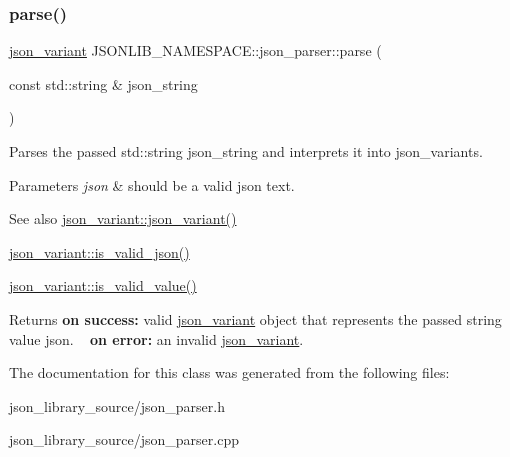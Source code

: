 \subsubsection{\texorpdfstring{parse()}{parse()}}
{\footnotesize\ttfamily \hyperlink{classJSONLIB__NAMESPACE_1_1json__variant}{json\+\_\+variant} J\+S\+O\+N\+L\+I\+B\+\_\+\+N\+A\+M\+E\+S\+P\+A\+C\+E\+::json\+\_\+parser\+::parse (\begin{DoxyParamCaption}\item[{const std\+::string \&}]{json\+\_\+string }\end{DoxyParamCaption})\hspace{0.3cm}{\ttfamily [static]}}



Parses the passed std\+::string {\ttfamily json\+\_\+string} and interprets it into json\+\_\+variants. 


\begin{DoxyParams}{Parameters}
{\em json} & should be a valid json text. \\
\hline
\end{DoxyParams}
\begin{DoxySeeAlso}{See also}
\hyperlink{classJSONLIB__NAMESPACE_1_1json__variant_a846c20ca7916959fcf8768f6c5bac36d}{json\+\_\+variant\+::json\+\_\+variant()} 

\hyperlink{classJSONLIB__NAMESPACE_1_1json__variant_a158e3148d9256af3d1b8251b2ca7b6c4}{json\+\_\+variant\+::is\+\_\+valid\+\_\+json()} 

\hyperlink{classJSONLIB__NAMESPACE_1_1json__variant_a224aab2dd56e3928dd893be8b7f3367a}{json\+\_\+variant\+::is\+\_\+valid\+\_\+value()} 
\end{DoxySeeAlso}
\begin{DoxyReturn}{Returns}
{\bfseries on success\+:} valid \hyperlink{classJSONLIB__NAMESPACE_1_1json__variant}{json\+\_\+variant} object that represents the passed string value {\ttfamily json}. ~\newline
 {\bfseries on error\+:} an invalid \hyperlink{classJSONLIB__NAMESPACE_1_1json__variant}{json\+\_\+variant}. 
\end{DoxyReturn}


The documentation for this class was generated from the following files\+:\begin{DoxyCompactItemize}
\item 
json\+\_\+library\+\_\+source/json\+\_\+parser.\+h\item 
json\+\_\+library\+\_\+source/json\+\_\+parser.\+cpp\end{DoxyCompactItemize}

